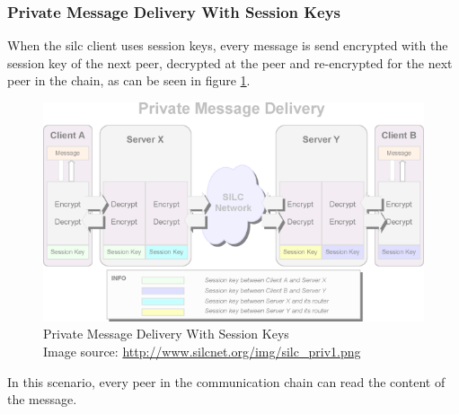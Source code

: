 \subsubsection{Private Message Delivery With Session Keys}
When the silc client uses session keys, every message is send encrypted
with the session key of the next peer, decrypted at the peer and re-encrypted
for the next peer in the chain, as can be seen in figure \ref{silcsessionkey}.
\begin{figure}
    \centering
    \caption[Silc: Private Message Delivery With Session Keys]{Private Message Delivery With Session Keys\\Image source: \protect\url{http://www.silcnet.org/img/silc_priv1.png}}
    \label{silcsessionkey}
    \includegraphics[scale=0.8]{silc_priv1.png}
\end{figure}
In this scenario, every peer in the communication chain
can read the content of the message.
